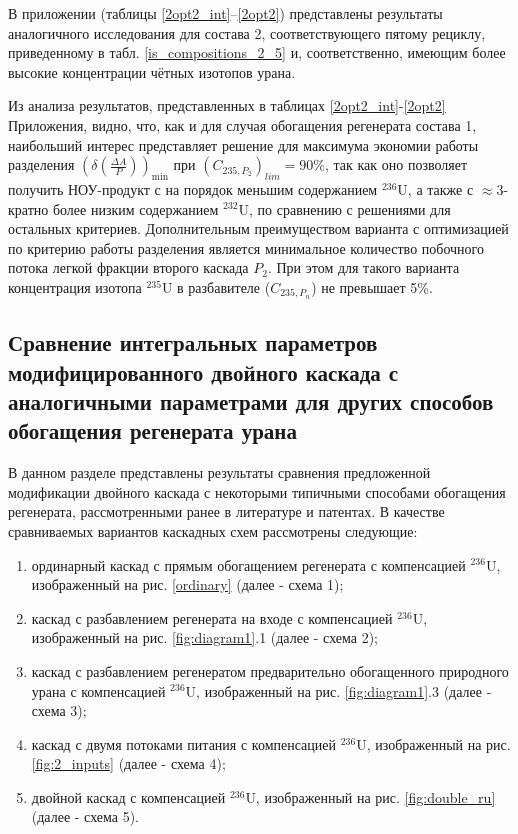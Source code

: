 В приложении (таблицы \ref{2opt2_int}--\ref{2opt2}) представлены результаты аналогичного исследования для состава 2, соответствующего пятому рециклу, приведенному в табл. \ref{is_compositions_2_5} и, соответственно, имеющим более высокие концентрации чётных изотопов урана.


Из анализа результатов, представленных в таблицах \ref{2opt2_int}-\ref{2opt2} Приложения, видно, что, как и для случая обогащения регенерата состава 1, наибольший интерес представляет решение для максимума экономии работы разделения $(\delta(\frac{\Delta A}{P}))_\text{min}$ при $({C_{235,{P_2}}})_{lim}=90\%$, так как оно позволяет получить НОУ-продукт с на порядок меньшим содержанием $^{236}$U, а также с $\approx$3-кратно более низким содержанием $^{232}$U, по сравнению с решениями для остальных критериев.
Дополнительным преимуществом варианта с оптимизацией по критерию работы разделения является минимальное количество побочного потока легкой фракции второго каскада $P_2$. 
При этом для такого варианта концентрация изотопа $^{235}$U в разбавителе ($C_{235,P_{n}}$) не превышает 5\%.

\subsection{Сравнение интегральных параметров модифицированного двойного каскада с аналогичными параметрами для других способов обогащения регенерата урана}\label{integral_comp}

В данном разделе представлены результаты сравнения предложенной модификации двойного каскада с некоторыми типичными способами обогащения регенерата, рассмотренными ранее в литературе и патентах. В качестве сравниваемых вариантов каскадных схем рассмотрены следующие: 

\begin{enumerate}
    \item ординарный каскад с прямым обогащением регенерата с компенсацией $^{236}$U, изображенный на рис. \ref{ordinary} (далее - схема 1);
    \item каскад с разбавлением регенерата на входе с компенсацией $^{236}$U, изображенный на рис. \ref{fig:diagram1}.1 (далее - схема 2);
    \item каскад с разбавлением регенератом предварительно обогащенного природного урана с компенсацией $^{236}$U, изображенный на рис. \ref{fig:diagram1}.3 (далее - схема 3);
    \item каскад с двумя потоками питания с компенсацией $^{236}$U, изображенный на рис. \ref{fig:2_inputs} (далее - схема 4);
    \item двойной каскад с компенсацией $^{236}$U, изображенный на рис. \ref{fig:double_ru} (далее - схема 5).
\end{enumerate}

